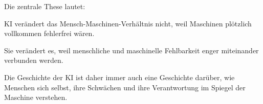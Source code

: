 Die zentrale These lautet:

KI verändert das Mensch-Maschinen-Verhältnis nicht,
weil Maschinen plötzlich vollkommen fehlerfrei wären.

Sie verändert es,
weil menschliche und maschinelle Fehlbarkeit
enger miteinander verbunden werden.

Die Geschichte der KI ist daher immer auch
eine Geschichte darüber,
wie Menschen sich selbst,
ihre Schwächen
und ihre Verantwortung
im Spiegel der Maschine verstehen.
